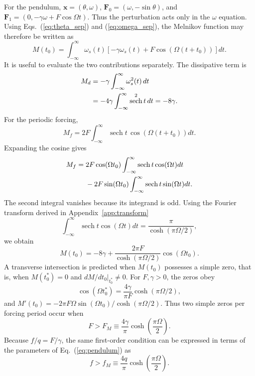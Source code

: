 \documentclass[aps,prb,reprint,floatfix]{revtex4-2}
\DeclareMathOperator{\sech}{sech}
\newcommand{\vect}[1]{\bm{#1}}
\begin{document}
For the pendulum, $\vect{x}=(\theta,\omega)$, $\vect F_0=(\omega,-\sin\theta)$, and $\vect F_1=(0,-\gamma\omega+F\cos\Omega t)$. Thus the perturbation acts only in the $\omega$ equation. Using Eqs.~(\ref{eq:theta_sep}) and (\ref{eq:omega_sep}), the Melnikov function may therefore be written as
\begin{equation}
 M(t_0)=\int_{-\infty}^{\infty}
 \omega_s(t)
 \left[-\gamma\omega_s(t)+F\cos\!\left(\Omega(t+t_0)\right)\right]dt.
\label{eq:melnikov_definition}
\end{equation}
It is useful to evaluate the two contributions separately. The dissipative term is
\begin{align}
 M_d&=-\gamma\int_{-\infty}^{\infty}\omega_s^2(t)\,dt\notag\\
 &=-4\gamma\int_{-\infty}^{\infty}\sech^2 t\,dt=-8\gamma.
\label{eq:melnikov_damping}
\end{align}
For the periodic forcing,
\begin{equation}
 M_f=2F\int_{-\infty}^{\infty}\sech t\,
 \cos\!\left(\Omega(t+t_0)\right)dt.
\label{eq:melnikov_force1}
\end{equation}
Expanding the cosine gives
\begin{align}
 M_f={}&2F\cos(\Omega t_0)
 \int_{-\infty}^{\infty}\sech t\cos(\Omega t)dt\notag\\
 &-2F\sin(\Omega t_0)
 \int_{-\infty}^{\infty}\sech t\sin(\Omega t)dt.
\label{eq:melnikov_force2}
\end{align}
The second integral vanishes because its integrand is odd. Using the Fourier transform derived in Appendix~\ref{app:transform}
\begin{equation}
 \int_{-\infty}^{\infty}\sech t\cos(\Omega t)dt
 =\frac{\pi}{\cosh(\pi\Omega/2)},
\label{eq:sechtransform}
\end{equation}
we obtain
\begin{equation}
 M(t_0)=-8\gamma+
 \frac{2\pi F}{\cosh(\pi\Omega/2)}\cos(\Omega t_0).
\label{eq:melnikov_final}
\end{equation}
A transverse intersection is predicted when $M(t_0)$ possesses a simple zero, that is, when $M(t_0^*)=0$ and $dM/dt_0|_{t_0^*}\neq0$. For $F,\gamma>0$, the zeros obey
\begin{equation}
\cos(\Omega t_0^*)=\frac{4\gamma}{\pi F}\cosh(\pi\Omega/2),
\end{equation}
and $M'(t_0)= -2\pi F\Omega\sin(\Omega t_0)/\cosh(\pi\Omega/2)$. Thus two simple zeros per forcing period occur when
\begin{equation}
 F>F_M\equiv\frac{4\gamma}{\pi}
 \cosh\!\left(\frac{\pi\Omega}{2}\right).
\label{eq:melnikov_threshold_scaled}
\end{equation}
Because $f/q=F/\gamma$, the same first-order condition can be expressed in terms of the parameters of Eq.~(\ref{eq:pendulum}) as
\begin{equation}
 f>f_M\equiv\frac{4q}{\pi}
 \cosh\!\left(\frac{\pi\Omega}{2}\right).
\label{eq:melnikov_threshold}
\end{equation}
\end{document}
